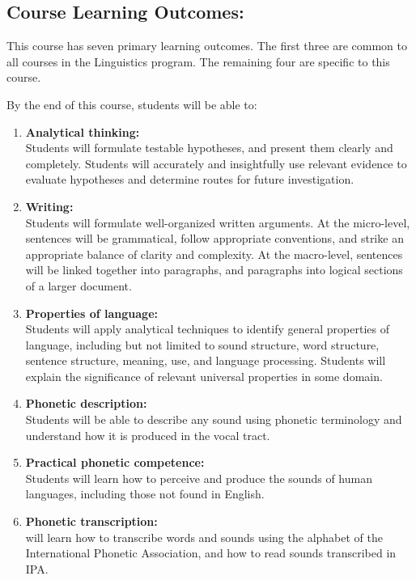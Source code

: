 \documentclass[12pt, letterpaper]{article}
\begin{document}
\subsection*{Course Learning Outcomes:} \label{sec:course_goals}

This course has seven primary learning outcomes. The first three are common to all courses in the Linguistics program. The remaining four are specific to this course. 

By the end of this course, students will be able to:
\begin{enumerate}
    \item \textbf{Analytical thinking:}\\ Students will formulate testable hypotheses, and present them clearly and completely. Students will accurately and insightfully use relevant evidence to evaluate hypotheses and determine routes for future investigation.

    \item \textbf{Writing:}\\ Students will formulate well-organized written arguments. At the micro-level, sentences will be grammatical, follow appropriate conventions, and strike an appropriate balance of clarity and complexity. At the macro-level, sentences will be linked together into paragraphs, and paragraphs into logical sections of a larger document.

    \item \textbf{Properties of language:}\\ Students will apply analytical techniques to identify general properties of language, including but not limited to sound structure, word structure, sentence structure, meaning, use, and language processing. Students will explain the significance of relevant universal properties in some domain.

    \item \textbf{Phonetic description:}\\ Students will be able to describe any sound using phonetic terminology and understand how it is produced in the vocal tract.

    \item \textbf{Practical phonetic competence:}\\ Students will learn how to perceive and produce the sounds of human languages, including those not found in English.

    \item \textbf{Phonetic transcription:}\\ will learn how to transcribe words and sounds using the alphabet of the International Phonetic Association, and how to read sounds transcribed in IPA.
\end{enumerate}
\end{document}

